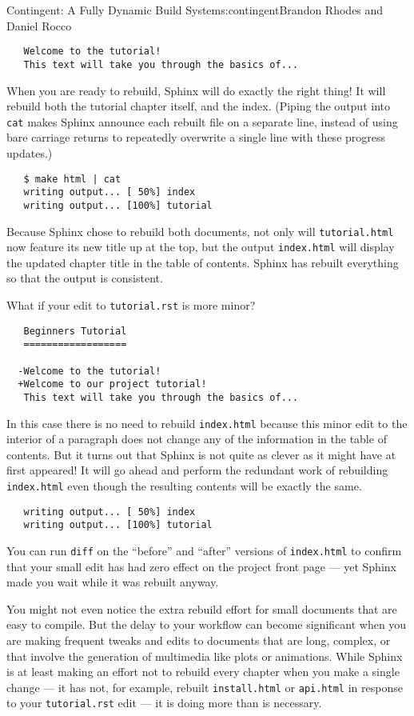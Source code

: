 \begin{aosachapter}{Contingent: A Fully Dynamic Build System}{s:contingent}{Brandon Rhodes and Daniel Rocco}
\begin{verbatim}
   Welcome to the tutorial!
   This text will take you through the basics of...
\end{verbatim}

When you are ready to rebuild, Sphinx will do exactly the right thing!
It will rebuild both the tutorial chapter itself, and the index. (Piping
the output into \texttt{cat} makes Sphinx announce each rebuilt file on
a separate line, instead of using bare carriage returns to repeatedly
overwrite a single line with these progress updates.)

\begin{verbatim}
   $ make html | cat
   writing output... [ 50%] index
   writing output... [100%] tutorial
\end{verbatim}

Because Sphinx chose to rebuild both documents, not only will
\texttt{tutorial.html} now feature its new title up at the top, but the
output \texttt{index.html} will display the updated chapter title in the
table of contents. Sphinx has rebuilt everything so that the output is
consistent.

What if your edit to \texttt{tutorial.rst} is more minor?

\begin{verbatim}
   Beginners Tutorial
   ==================

  -Welcome to the tutorial!
  +Welcome to our project tutorial!
   This text will take you through the basics of...
\end{verbatim}

In this case there is no need to rebuild \texttt{index.html} because
this minor edit to the interior of a paragraph does not change any of
the information in the table of contents. But it turns out that Sphinx
is not quite as clever as it might have at first appeared! It will go
ahead and perform the redundant work of rebuilding \texttt{index.html}
even though the resulting contents will be exactly the same.

\begin{verbatim}
   writing output... [ 50%] index
   writing output... [100%] tutorial
\end{verbatim}

You can run \texttt{diff} on the ``before'' and ``after'' versions of
\texttt{index.html} to confirm that your small edit has had zero effect
on the project front page --- yet Sphinx made you wait while it was
rebuilt anyway.

You might not even notice the extra rebuild effort for small documents
that are easy to compile. But the delay to your workflow can become
significant when you are making frequent tweaks and edits to documents
that are long, complex, or that involve the generation of multimedia
like plots or animations. While Sphinx is at least making an effort not
to rebuild every chapter when you make a single change --- it has not,
for example, rebuilt \texttt{install.html} or \texttt{api.html} in
response to your \texttt{tutorial.rst} edit --- it is doing more than is
necessary.


\end{aosachapter}
